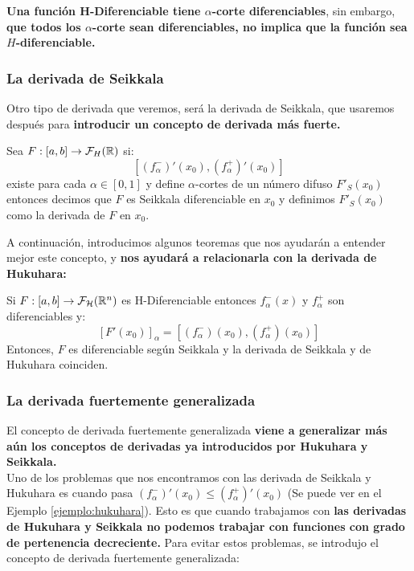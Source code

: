 \textbf{Una función H-Diferenciable tiene $\alpha$-corte diferenciables}, sin embargo, \textbf{que todos los $\alpha$-corte sean diferenciables, no implica que la función sea $H$-diferenciable.}

\subsubsection{La derivada de Seikkala}
Otro tipo de derivada que veremos, será la derivada de Seikkala, que usaremos después para \textbf{introducir un concepto de derivada más fuerte.}

\begin{definicion}
	Sea $F: [a, b] \rightarrow \mathcal{F}_H(\mathbb R)$ si:
	\[
		[(f^-_\alpha)'(x_0), (f^+_\alpha)'(x_0)]
	\]
	existe para cada $\alpha \in [0, 1]$ y define $\alpha$-cortes de un número difuso $F'_S(x_0)$ entonces decimos que $F$ es Seikkala diferenciable en $x_0$ y definimos $F'_S(x_0)$ como la derivada de $F$ en $x_0$.
\end{definicion}

A continuación, introducimos algunos teoremas que nos ayudarán a entender mejor este concepto, y \textbf{nos ayudará a relacionarla con la derivada de Hukuhara:}

\begin{teorema}
	Si $F: [a, b] \rightarrow \mathcal{F}_\mathcal{H}(\mathbb R^n)$ es H-Diferenciable entonces $f_\alpha^-(x)$ y $f_\alpha^+$ son diferenciables y:
	\[
		[F'(x_0)]_\alpha = [(f_\alpha^-)(x_0), (f_\alpha^+)(x_0)]
	\]
	Entonces, $F$ es diferenciable según Seikkala y la derivada de Seikkala y de Hukuhara coinciden.
\end{teorema}

\subsubsection{La derivada fuertemente generalizada}
El concepto de derivada fuertemente generalizada \textbf{viene a generalizar más aún los conceptos de derivadas ya introducidos por Hukuhara y Seikkala.} \\
Uno de los problemas que nos encontramos con las derivada de Seikkala y Hukuhara es cuando pasa $(f^-_\alpha)'(x_0) \leq (f^+_\alpha)'(x_0)$ (Se puede ver en el Ejemplo \ref{ejemplo:hukuhara}). Esto es que cuando trabajamos con \textbf{las derivadas de Hukuhara y Seikkala no podemos trabajar con funciones con grado de pertenencia decreciente.} Para evitar estos problemas, se introdujo el concepto de derivada fuertemente generalizada:

